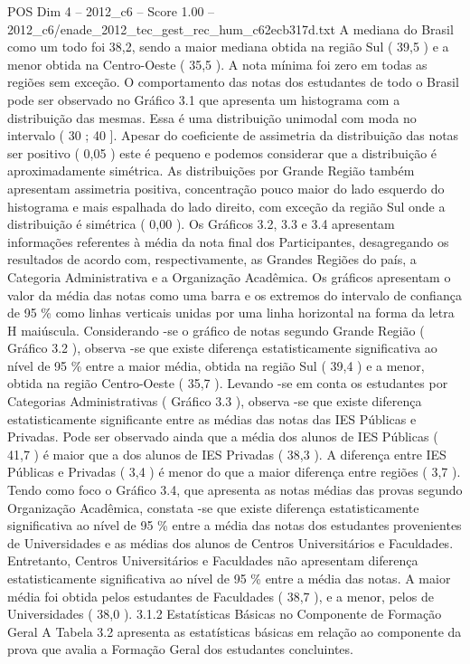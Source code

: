 \begin{textsample}{POS Dim 4 – 2012\_c6 – Score 1.00 – 2012\_c6/enade\_2012\_tec\_gest\_rec\_hum\_c62ecb317d.txt}
A mediana do Brasil como um todo foi 38,2, sendo a maior mediana obtida na região Sul ( 39,5 ) e a menor obtida na Centro-Oeste ( 35,5 ).
A nota mínima foi zero em todas as regiões sem exceção.
O comportamento das notas dos estudantes de todo o Brasil pode ser observado no Gráfico 3.1 que apresenta um histograma com a distribuição das mesmas.
Essa é uma distribuição unimodal com moda no intervalo ( 30 ; 40 ].
Apesar do coeficiente de assimetria da distribuição das notas ser positivo ( 0,05 ) este é pequeno e podemos considerar que a distribuição é aproximadamente simétrica.
As distribuições por Grande Região também apresentam assimetria positiva, concentração pouco maior do lado esquerdo do histograma e mais espalhada do lado direito, com exceção da região Sul onde a distribuição é simétrica ( 0,00 ).
Os Gráficos 3.2, 3.3 e 3.4 apresentam informações referentes à média da nota final dos Participantes, desagregando os resultados de acordo com, respectivamente, as Grandes Regiões do país, a Categoria Administrativa e a Organização Acadêmica.
Os gráficos apresentam o valor da média das notas como uma barra e os extremos do intervalo de confiança de 95 \% como linhas verticais unidas por uma linha horizontal na forma da letra H maiúscula.
Considerando -se o gráfico de notas segundo Grande Região ( Gráfico 3.2 ), observa -se que existe diferença estatisticamente significativa ao nível de 95 \% entre a maior média, obtida na região Sul ( 39,4 ) e a menor, obtida na região Centro-Oeste ( 35,7 ).
Levando -se em conta os estudantes por Categorias Administrativas ( Gráfico 3.3 ), observa -se que existe diferença estatisticamente significante entre as médias das notas das IES Públicas e Privadas.
Pode ser observado ainda que a média dos alunos de IES Públicas ( 41,7 ) é maior que a dos alunos de IES Privadas ( 38,3 ).
A diferença entre IES Públicas e Privadas ( 3,4 ) é menor do que a maior diferença entre regiões ( 3,7 ).
Tendo como foco o Gráfico 3.4, que apresenta as notas médias das provas segundo Organização Acadêmica, constata -se que existe diferença estatisticamente significativa ao nível de 95 \% entre a média das notas dos estudantes provenientes de Universidades e as médias dos alunos de Centros Universitários e Faculdades.
Entretanto, Centros Universitários e Faculdades não apresentam diferença estatisticamente significativa ao nível de 95 \% entre a média das notas.
A maior média foi obtida pelos estudantes de Faculdades ( 38,7 ), e a menor, pelos de Universidades ( 38,0 ). 3.1.2 Estatísticas Básicas no Componente de Formação Geral A Tabela 3.2 apresenta as estatísticas básicas em relação ao componente da prova que avalia a Formação Geral dos estudantes concluintes.

\end{textsample}
